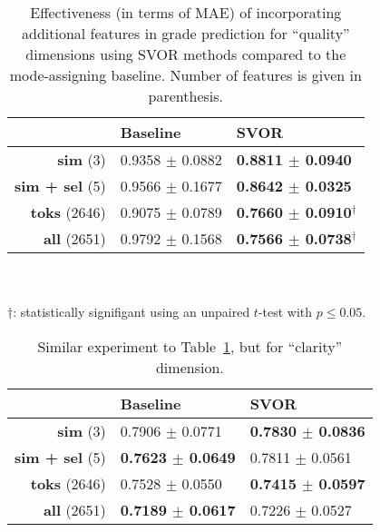\begin{table}
    \begin{tabular}{r|l|l}
        & \textbf{Baseline} & \textbf{SVOR}\\\hline

        \textbf{sim} (3)
        & 0.9358 $\pm$ 0.0882
        & \textbf{0.8811 $\pm$ 0.0940}
        \\\hline

        \textbf{sim + sel} (5)
        & 0.9566 $\pm$ 0.1677
        & \textbf{0.8642 $\pm$ 0.0325}
        \\\hline

        \textbf{toks} (2646)
        & 0.9075 $\pm$ 0.0789
        & \textbf{0.7660 $\pm$ 0.0910$^\dagger$}
        \\\hline

        \textbf{all} (2651)
        & 0.9792 $\pm$ 0.1568
        & \textbf{0.7566 $\pm$ 0.0738$^\dagger$}
        \\\hline
    \end{tabular}
    \\\\
    {\footnotesize
    $\dagger$: statistically signifigant using an unpaired $t$-test with $p
    \leq 0.05$.}

    \caption{Effectiveness (in terms of MAE) of incorporating additional
    features in grade prediction for ``quality'' dimensions using SVOR
    methods compared to the mode-assigning baseline. Number of features is
    given in parenthesis.}
    \label{table:feature-comb}
\end{table}

\begin{table}
    \begin{tabular}{r|l|l}
        & \textbf{Baseline} & \textbf{SVOR}\\\hline

        \textbf{sim} (3)
        & 0.7906 $\pm$ 0.0771
        & \textbf{0.7830 $\pm$ 0.0836}
        \\\hline

        \textbf{sim + sel} (5)
        & \textbf{0.7623 $\pm$ 0.0649}
        & 0.7811 $\pm$ 0.0561
        \\\hline

        \textbf{toks} (2646)
        & 0.7528 $\pm$ 0.0550
        & \textbf{0.7415 $\pm$ 0.0597}
        \\\hline

        \textbf{all} (2651)
        & \textbf{0.7189 $\pm$ 0.0617}
        & 0.7226 $\pm$ 0.0527
        \\\hline
    \end{tabular}

    \caption{Similar experiment to Table~\ref{table:feature-comb}, but for
    ``clarity'' dimension.}
    \label{table:feature-comb-clar}
\end{table}
